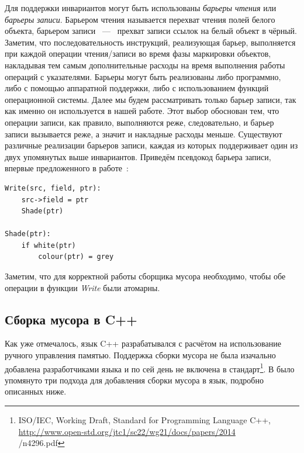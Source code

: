 Для поддержки инвариантов могут быть использованы \emph{барьеры чтения} или 
\emph{барьеры записи}. 
Барьером чтения называется перехват чтения полей белого объекта, барьером записи ~---~ 
прехват записи ссылок на белый объект в чёрный. 
Заметим, что последовательность инструкций, реализующая барьер, выполняется при каждой 
операции чтения/записи во время фазы маркировки объектов, накладывая тем самым дополнительные 
расходы на время выполнения работы операций с указателями. 
Барьеры могут быть реализованы либо программно, либо с помощью аппаратной поддержки, 
либо с использованием функций операционной системы. 
Далее мы будем рассматривать только барьер записи, так как именно он используется в нашей 
работе. 
Этот выбор обоснован тем, что операции записи, как правило, выполняются реже, 
следовательно, и барьер записи вызывается реже, а значит и накладные расходы 
меньше. 
Существуют различные реализации барьеров записи, каждая из которых 
поддерживает один из двух упомянутых выше инвариантов. 
Приведём псевдокод барьера записи, впервые предложенного в работе~\cite{dijkstra1978fly}:

\begin{minipage}{\linewidth}
\begin{lstlisting}[caption={Dijkstra Barier}, label={code:write_barrier}]
Write(src, field, ptr):
    src->field = ptr
    Shade(ptr)
    
Shade(ptr):
    if white(ptr)
        colour(ptr) = grey
\end{lstlisting}
\end{minipage}

Заметим, что для корректной работы сборщика мусора необходимо, чтобы обе операции в функции 
\emph{Write} были атомарны. 


\subsection{Сборка мусора в C++}

Как уже отмечалось, язык C++ разрабатывался с расчётом на использование 
ручного управления памятью. 
Поддержка сборки мусора не была изачально добавлена разработчиками языка и по сей день 
не включена в стандарт\footnote{ISO/IEC, Working Draft, Standard for Programming Language C++,
\url{http://www.open-std.org/jtc1/sc22/wg21/docs/papers/2014}\\{/n4296.pdf}}. 
В \cite{boehm2007transparent} было упомянуто три подхода для добавления сборки мусора в 
язык, подробно описанных ниже.

